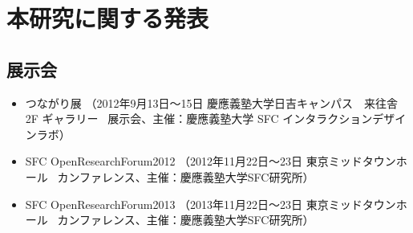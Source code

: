 \chapter{本研究に関する発表}\label{chap:publication}

\section{展示会}

\begin{itemize}

\item つながり展 （2012年9月13日〜15日
慶應義塾大学日吉キャンパス　来往舎2F ギャラリー \
展示会、主催：慶應義塾大学 SFC インタラクションデザインラボ）

\item SFC OpenResearchForum2012 （2012年11月22日〜23日
東京ミッドタウンホール \
カンファレンス、主催：慶應義塾大学SFC研究所）

\item SFC OpenResearchForum2013 （2013年11月22日〜23日
東京ミッドタウンホール \
カンファレンス、主催：慶應義塾大学SFC研究所）

\end{itemize}
